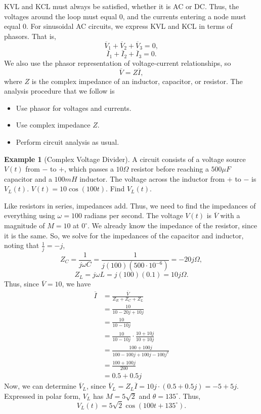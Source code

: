 \documentclass[11pt]{article}
\theoremstyle{plain} %
\theoremstyle{definition}
\theoremstyle{example}
\newtheorem*{example}{Example}
\theoremstyle{remark}
\newcommand{\degree}{^{\circ}}
\begin{document}
KVL and KCL must always be satisfied, whether it is AC or DC. Thus, the voltages around the loop must equal 0, and the currents entering a node must equal 0. For sinusoidal AC circuits, we express KVL and KCL in terms of phasors. That is, 
$$\overline V_1 + \overline V_2 + \overline V_3 = 0,$$
$$\overline I_1 + \overline I_2 + \overline I_3 = 0.$$
We also use the phasor representation of voltage-current relationships, so
$$\overline V = Z\overline I,$$
where $Z$ is the complex impedance of an inductor, capacitor, or resistor. The analysis procedure that we follow is 
\begin{itemize}
	\item Use phasor for voltages and currents. 
	\item Use complex impedance $Z$. 
	\item Perform circuit analysis as usual. 
\end{itemize}
\begin{example}[Complex Voltage Divider]
A circuit consists of a voltage source $V(t)$ from $-$ to $+$, which passes a $10\Omega$ resistor before reaching a $500\mu F$ capacitor and a $100mH$ inductor. The voltage across the inductor from $+$ to $-$ is $V_L(t)$. $V(t) = 10\cos(100t)$. Find $V_L(t)$. 
\end{example}
Like resistors in series, impedances add. Thus, we need to find the impedances of everything using $\omega = 100$ radians per second. The voltage $V(t)$ is $\overline V$ with a magnitude of $M = 10$ at $0^{\circ}$. We already know the impedance of the resistor, since it is the same. So, we solve for the impedances of the capacitor and inductor, noting that $\frac{1}{j} = -j$,
$$Z_C= \frac{1}{j\omega C} = \frac{1}{j(100)\left(500\cdot 10^{-6}\right)} = -20j \Omega,$$
$$Z_L= j\omega L =j(100)(0.1) = 10j \Omega.$$
Thus, since $\overline V = 10$, we have 
\begin{align*}
	\overline I &= \frac{\overline V}{Z_R + Z_C+Z_L}\\
	&= \frac{10}{10-20j+10j}\\
	&= \frac{10}{10-10j}\\
	&= \frac{10}{10-10j}\cdot \frac{10+10j}{10+10j}\\
	&= \frac{100+100j}{100-100j+100j-100j^2}\\
	&= \frac{100+100j}{200}\\
	&= 0.5+0.5j
\end{align*}
Now, we can determine $\overline V_L$, since $\overline V_L = Z_L\overline I = 10j \cdot (0.5+0.5j) = -5+5j$. Expressed in polar form, $V_L$ has $M = 5\sqrt 2$ and $\theta = 135^{\circ}$. Thus, 
$$V_L(t) = 5\sqrt 2 \cos\left(100t + 135\degree\right).$$
\end{document}
